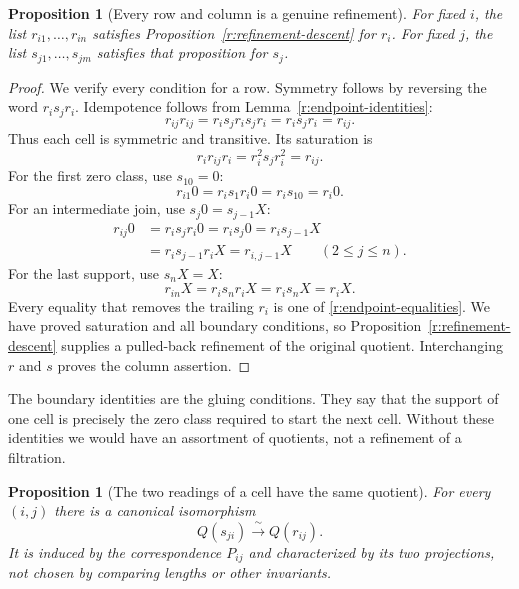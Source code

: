\documentclass[11pt]{article}
\newtheorem{proposition}[theorem]{Proposition}
\theoremstyle{definition}
\theoremstyle{remark}\newtheorem{remark}[theorem]{Remark}
\begin{document}
\begin{proposition}[Every row and column is a genuine refinement]
\label{r:rectangle-refines}
For fixed $i$, the list $r_{i1},\ldots,r_{in}$ satisfies
Proposition~\ref{r:refinement-descent} for $r_i$.  For fixed $j$, the list
$s_{j1},\ldots,s_{jm}$ satisfies that proposition for $s_j$.
\end{proposition}

\begin{proof}
We verify every condition for a row.  Symmetry follows by reversing the
word $r_is_jr_i$.  Idempotence follows from
Lemma~\ref{r:endpoint-identities}:
\[
 r_{ij}r_{ij}=r_is_jr_is_jr_i=r_is_jr_i=r_{ij}.
\]
Thus each cell is symmetric and transitive.  Its saturation is
\[
       r_i r_{ij}r_i=r_i^2s_jr_i^2=r_{ij}.
\]
For the first zero class, use $s_10=0$:
\[
            r_{i1}0=r_is_1r_i0=r_is_10=r_i0.
\]
For an intermediate join, use $s_j0=s_{j-1}X$:
\[
\begin{split}
 r_{ij}0
 &=r_is_jr_i0=r_is_j0
  =r_is_{j-1}X\\
 &=r_is_{j-1}r_iX=r_{i,j-1}X
                  \qquad(2\leq j\leq n).
\end{split}
\]
For the last support, use $s_nX=X$:
\[
                 r_{in}X=r_is_nr_iX=r_is_nX=r_iX.
\]
Every equality that removes the trailing $r_i$ is one of
\eqref{r:endpoint-equalities}.  We have proved saturation and all boundary
conditions, so Proposition~\ref{r:refinement-descent} supplies a
pulled-back refinement of the original quotient.  Interchanging $r$ and
$s$ proves the column assertion.
\end{proof}

The boundary identities are the gluing conditions.  They say that the
support of one cell is precisely the zero class required to start the
next cell.  Without these identities we would have an assortment of
quotients, not a refinement of a filtration.

\begin{proposition}[The two readings of a cell have the same quotient]
\label{r:cell-isomorphism}
For every $(i,j)$ there is a canonical isomorphism
\begin{equation}
\label{r:cell-iso}
                       Q(s_{ji})\xrightarrow{\ \sim\ }Q(r_{ij}).
\end{equation}
It is induced by the correspondence $P_{ij}$ and characterized by its
two projections, not chosen by comparing lengths or other invariants.
\end{proposition}
\end{document}
